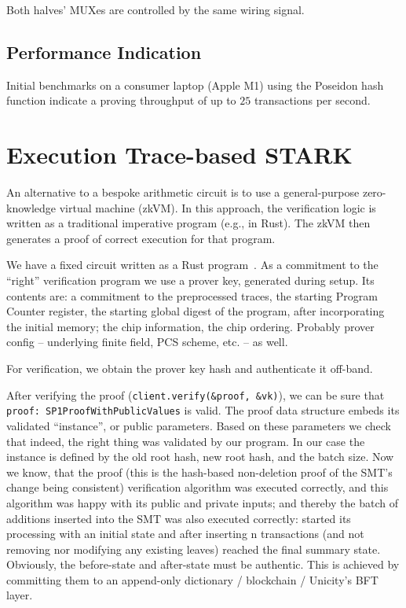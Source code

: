 \documentclass[twocolumn]{article}
\begin{document}
Both halves' MUXes are controlled by the same wiring signal.

\subsection{Performance Indication}

Initial benchmarks on a consumer laptop (Apple M1) using the Poseidon hash function indicate a proving throughput of up to $25$ transactions per second.


\section{Execution Trace-based STARK}

An alternative to a bespoke arithmetic circuit is to use a general-purpose zero-knowledge virtual machine (zkVM). In this approach, the verification logic is written as a traditional imperative program (e.g., in Rust). The zkVM then generates a proof of correct execution for that program.


We have a fixed circuit written as a Rust program~\cite{stark}. As a commitment to the ``right'' verification program we use a prover key, generated during setup. Its contents are: a commitment to the preprocessed traces, the starting Program Counter register, the starting global digest of the program, after incorporating the initial memory; the chip information, the chip ordering. Probably prover config -- underlying finite field, PCS scheme, etc. -- as well.

For verification, we obtain the prover key hash and authenticate it off-band.

\begin{sloppypar}
After verifying the proof (\lstinline|client.verify(&proof, &vk)|), we can be sure that \lstinline|proof: SP1ProofWithPublicValues| is valid. The proof data structure embeds its validated ``instance'', or public parameters. Based on these parameters we check that indeed, the right thing was validated by our program. In our case the instance is defined by the old root hash, new root hash, and the batch size. Now we know, that the proof (this is the hash-based non-deletion proof of the SMT's change being consistent) verification algorithm was executed correctly, and this algorithm was happy with its public and private inputs; and thereby the batch of additions inserted into the SMT was also executed correctly: started its processing with an initial state and after inserting n transactions (and not removing nor modifying any existing leaves) reached the final summary state. Obviously, the before-state and after-state must be authentic. This is achieved by committing them to an append-only dictionary / blockchain / Unicity's BFT layer.
\end{sloppypar}
\end{document}
